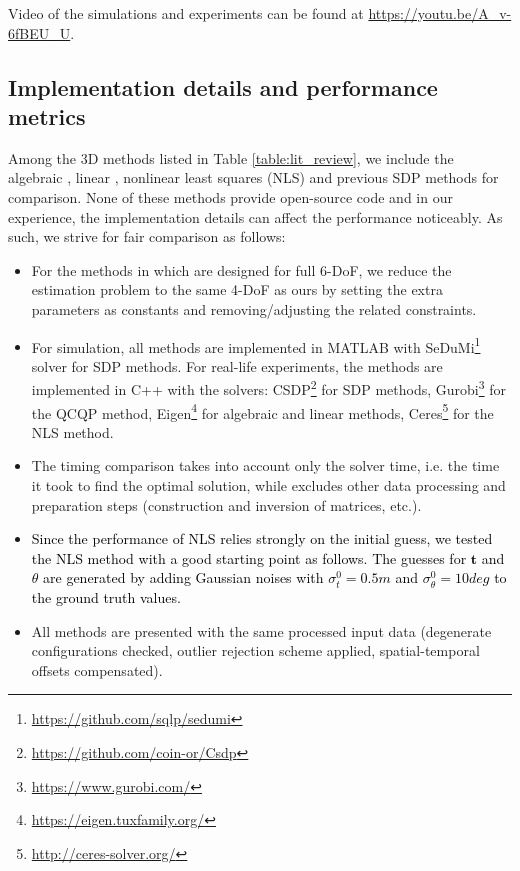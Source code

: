 \documentclass[journal]{IEEEtran}
\begin{document}
Video of the simulations and experiments can be found at \url{https://youtu.be/A_v-6fBEU_U}.

\subsection{Implementation details and performance metrics}

Among the 3D methods listed in Table \ref{table:lit_review}, we include the algebraic \cite{trawny2010rel3Dtransform}, linear \cite{molina2019unique}, nonlinear least squares (NLS) \cite{ziegler2021distributed} and previous SDP \cite{jiang2020rel3D} methods for comparison. None of these methods provide open-source code and in our experience, the implementation details can affect the performance noticeably. As such, we strive for fair comparison as follows:
\begin{itemize}
    \item For the methods in \cite{trawny2010rel3Dtransform,jiang2020rel3D} which are designed for full 6-DoF, we reduce the estimation problem to the same 4-DoF as ours by setting the extra parameters as constants and removing/adjusting the related constraints.
    \item For simulation, all methods are implemented in MATLAB with SeDuMi\footnote{\url{https://github.com/sqlp/sedumi}} solver for SDP methods. For real-life experiments, the methods are implemented in C++ with the solvers: CSDP\footnote{\url{https://github.com/coin-or/Csdp}} for SDP methods, Gurobi\footnote{\url{https://www.gurobi.com/}} for the QCQP method, Eigen\footnote{\url{https://eigen.tuxfamily.org/}} for algebraic and linear methods, Ceres\footnote{\url{http://ceres-solver.org/}} for the NLS method.
    \item The timing comparison takes into account only the solver time, i.e. the time it took to find the optimal solution, while excludes other data processing and preparation steps (construction and inversion of matrices, etc.).
    \item \textcolor{black}{Since the performance of NLS relies strongly on the initial guess, we tested the NLS method with a good starting point as follows. The guesses for $\mathbf{t}$ and $\theta$ are generated by adding Gaussian noises with $\sigma_t^0 = 0.5\si{m}$ and $\sigma_{\theta}^0 = 10\si{deg}$ to the ground truth values.}
    \item All methods are presented with the same processed input data (degenerate configurations checked, outlier rejection scheme applied, spatial-temporal offsets compensated).
\end{itemize}
\end{document}
